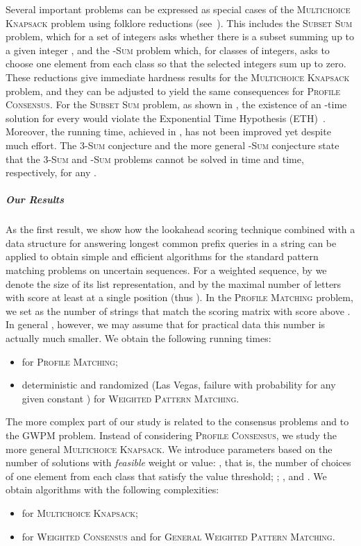 \documentclass{article}
\theoremstyle{plain}
\theoremstyle{definition}
\newcommand{\MK}{\textsc{Multichoice Knapsack}\xspace}
\newcommand{\PM}{\textsc{Profile Matching}\xspace}
\newcommand{\WPM}{\textsc{Weighted Pattern Matching}\xspace}
\newcommand{\GWPM}{\textsc{GWPM}\xspace}
\newcommand{\GWPMFull}{\textsc{General Weighted Pattern Matching}\xspace}
\newcommand{\WC}{\textsc{Weighted Consensus}\xspace}
\newcommand{\PC}{\textsc{Profile Consensus}\xspace}
\newcommand{\SubsetSum}{\textsc{Subset Sum}\xspace}
\newcommand{\Sum}{\textsc{Sum}\xspace}
\begin{document}
  Several important problems can be expressed as special cases of the \MK problem using folklore reductions (see~\cite{DBLP:books/daglib/0010031}).
  This includes the \SubsetSum problem, which for a set of  integers asks whether there is a subset summing up to a given integer ,
  and the -\Sum problem which, for  classes of  integers, asks to choose one element from each
  class so that the selected integers sum up to zero. 
  These reductions give immediate hardness results for the \MK problem, and they can be adjusted to yield the same consequences for \PC.
  For the \SubsetSum problem, as shown in \cite{DBLP:conf/mfcs/EtscheidKMR15,DBLP:books/daglib/0069796}, the existence of an -time solution for every 
  would violate the Exponential Time Hypothesis (ETH)~\cite{DBLP:journals/jcss/ImpagliazzoP01,ETHsurvey}.
  Moreover, the  running time, achieved in \cite{DBLP:journals/jacm/HorowitzS74}, has not been improved yet despite much effort.
  The 3-\Sum conjecture \cite{DBLP:journals/comgeo/GajentaanO95} and the more general -\Sum conjecture state that the 3-\Sum and -\Sum problems cannot be solved in
   time and  time, respectively, for any .



  \subparagraph*{Our Results}
  As the first result, we show how the lookahead scoring technique combined with a data structure
  for answering longest common prefix queries in a string can be applied to obtain simple and efficient
  algorithms for the standard pattern matching problems on uncertain sequences.
  For a weighted sequence, by  we denote the size of its list representation, and by  the
  maximal number of letters with score at least  at a single position (thus ).
  In the \PM problem, we set  as the number of strings that match the scoring matrix with score above .
  In general , however, we may assume that for practical data this number is actually much smaller.
  We obtain the following running times:
  \begin{itemize}
    \item  for \PM;
    \item  deterministic and  randomized (Las Vegas, failure with probability 
    for any given constant ) for \WPM.
  \end{itemize}
  
  The more complex part of our study is related to the consensus problems and to the \GWPM problem.
  Instead of considering \PC, we study the more general \MK.
  We introduce parameters based on the number of solutions with \emph{feasible} weight or value:
  , that is,
  the number of choices of one element from each class that satisfy the value threshold;
  ;
  , and .
  We obtain algorithms with the following complexities:
  \begin{itemize}
    \item  for \MK;
    \item  for \WC and  for \GWPMFull.
  \end{itemize}
  
\end{document}
